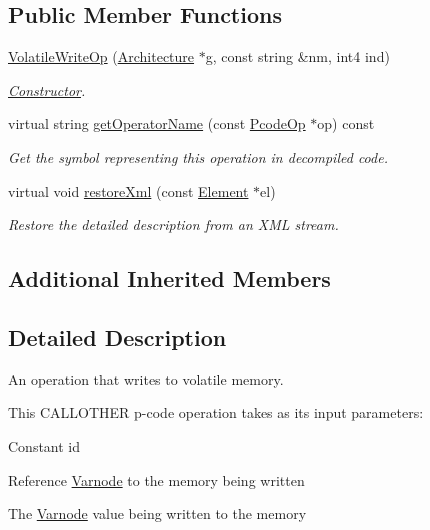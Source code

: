 \subsection*{Public Member Functions}
\begin{DoxyCompactItemize}
\item 
\mbox{\hyperlink{class_volatile_write_op_a65eb87426c8fdceab232499519c8188f}{Volatile\+Write\+Op}} (\mbox{\hyperlink{class_architecture}{Architecture}} $\ast$g, const string \&nm, int4 ind)
\begin{DoxyCompactList}\small\item\em \mbox{\hyperlink{class_constructor}{Constructor}}. \end{DoxyCompactList}\item 
virtual string \mbox{\hyperlink{class_volatile_write_op_aba63c56acfa184a248cfa78e1d346af5}{get\+Operator\+Name}} (const \mbox{\hyperlink{class_pcode_op}{Pcode\+Op}} $\ast$op) const
\begin{DoxyCompactList}\small\item\em Get the symbol representing this operation in decompiled code. \end{DoxyCompactList}\item 
virtual void \mbox{\hyperlink{class_volatile_write_op_a7d0ae9b968d11ff809a46dec31e94d43}{restore\+Xml}} (const \mbox{\hyperlink{class_element}{Element}} $\ast$el)
\begin{DoxyCompactList}\small\item\em Restore the detailed description from an X\+ML stream. \end{DoxyCompactList}\end{DoxyCompactItemize}
\subsection*{Additional Inherited Members}


\subsection{Detailed Description}
An operation that writes to volatile memory. 

This C\+A\+L\+L\+O\+T\+H\+ER p-\/code operation takes as its input parameters\+:
\begin{DoxyItemize}
\item Constant id
\item Reference \mbox{\hyperlink{class_varnode}{Varnode}} to the memory being written
\item The \mbox{\hyperlink{class_varnode}{Varnode}} value being written to the memory 
\end{DoxyItemize}

